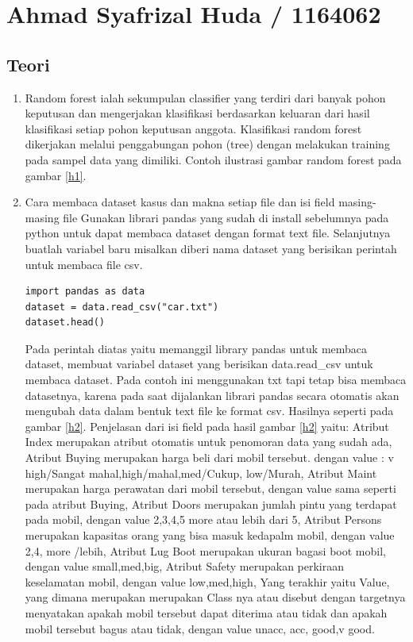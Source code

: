 \section{Ahmad Syafrizal Huda / 1164062}
\subsection{Teori}
\begin{enumerate}
\item Random forest ialah sekumpulan classifier yang terdiri dari banyak pohon keputusan dan mengerjakan klasifikasi berdasarkan keluaran dari hasil klasifikasi setiap pohon keputusan anggota. Klasifikasi random forest dikerjakan melalui penggabungan pohon (tree) dengan melakukan training pada sampel data yang dimiliki. Contoh ilustrasi gambar random forest pada gambar \ref{h1}.
\item Cara membaca dataset kasus dan makna setiap file dan isi field masing-masing file
\subitem Gunakan librari pandas yang sudah di install sebelumnya pada python untuk dapat membaca dataset dengan format text file.
\subitem  Selanjutnya buatlah variabel baru misalkan diberi nama dataset yang berisikan perintah untuk membaca file csv.
\begin{verbatim}
import pandas as data
dataset = data.read_csv("car.txt")
dataset.head()
\end{verbatim}
\subitem Pada perintah diatas yaitu memanggil library pandas untuk membaca dataset, membuat variabel dataset yang berisikan data.read\_csv untuk membaca dataset. Pada contoh ini menggunakan txt tapi tetap bisa membaca datasetnya, karena pada saat dijalankan librari pandas secara otomatis akan mengubah data dalam bentuk text file ke format csv. Hasilnya seperti pada gambar \ref{h2}.
\subitem Penjelasan dari isi field pada hasil gambar \ref{h2} yaitu: Atribut Index merupakan atribut otomatis untuk penomoran data yang sudah ada, Atribut Buying merupakan harga beli dari mobil tersebut. dengan value : v high/Sangat mahal,high/mahal,med/Cukup, low/Murah, Atribut Maint merupakan harga perawatan dari mobil tersebut, dengan value sama seperti pada atribut Buying, Atribut Doors merupakan jumlah pintu yang terdapat pada mobil, dengan value 2,3,4,5 more atau lebih dari 5, Atribut Persons merupakan kapasitas orang yang bisa masuk kedapalm mobil, dengan value 2,4, more /lebih, Atribut Lug Boot merupakan ukuran bagasi boot mobil, dengan value small,med,big, Atribut Safety merupakan perkiraan keselamatan mobil, dengan value low,med,high, Yang terakhir yaitu Value, yang dimana merupakan merupakan Class nya atau disebut dengan targetnya menyatakan apakah mobil tersebut dapat diterima atau tidak dan apakah mobil tersebut bagus atau tidak, dengan value unacc, acc, good,v good.

\end{enumerate}
